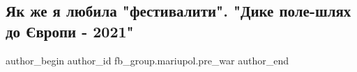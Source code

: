  
 
 
 
 

\subsection{Як же я любила "фестивалити". "Дике поле-шлях до Європи - 2021"}
\label{sec:12_02_2023.fb.fb_group.mariupol.pre_war.8.yak_zhe_ya_lyubila__}

\ifcmt
 author_begin
   author_id fb_group.mariupol.pre_war
 author_end
\fi
